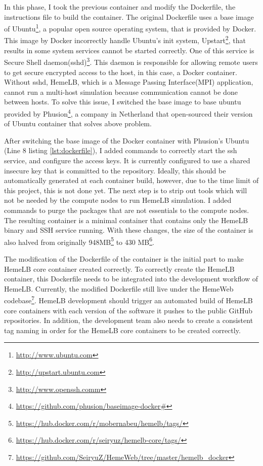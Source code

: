 In this phase, I took the previous container and modify the Dockerfile, the instructions file to build the container. The original Dockerfile uses a base image of Ubuntu\footnote{\url{http://www.ubuntu.com}}, a popular open source operating system, that is provided by Docker. This image by Docker incorrectly handle Ubuntu's init system, Upstart\footnote{\url{http://upstart.ubuntu.com}}, that results in some system services cannot be started correctly. One of this service is Secure Shell daemon(sshd)\footnote{\url{http://www.openssh.comm}}. This daemon is responsible for allowing remote users to get secure encrypted access to the host, in this case, a Docker container. Without sshd, HemeLB, which is a Message Passing Interface(MPI) application, cannot run a multi-host simulation because communication cannot be done between hosts.  To solve this issue, I switched the base image to base ubuntu provided by Phusion\footnote{\url{https://github.com/phusion/baseimage-docker#}}, a company in Netherland that open-sourced their version of Ubuntu container that solves above problem.

After switching the base image of the Docker container with Phusion's Ubuntu (Line 8 listing  \ref{lst:dockerfile}), I added commands to correctly start the ssh service, and configure the access keys. It is currently configured to use a shared insecure key that is committed to the repository. Ideally, this should be automatically generated at each container build, however, due to the  time limit of this project, this is not done yet. The next step is to strip out tools which will not be needed by the compute nodes to run HemeLB simulation. I added commands to purge the packages that are not essentials to the compute nodes. The resulting container is a minimal container that contains only the HemeLB binary and SSH service running. With these changes, the size of the container is also halved from originally 948MB\footnote{\url{https://hub.docker.com/r/mobernabeu/hemelb/tags/}} to 430 MB\footnote{\url{https://hub.docker.com/r/seiryuz/hemelb-core/tags/}}.


The modification of the Dockerfile of the container is the initial part to make HemeLB core container created correctly. To correctly create the HemeLB container, this Dockerfile needs to be integrated into the development workflow of HemeLB. Currently, the modified Dockerfile still live under the HemeWeb codebase\footnote{\url{https://github.com/SeiryuZ/HemeWeb/tree/master/hemelb_docker}}. HemeLB development should trigger an automated build of HemeLB core containers with each version of the software it pushes to the public GitHub repositories. In addition, the development team also needs to create a consistent tag naming in order for the HemeLB core containers to be created correctly.


